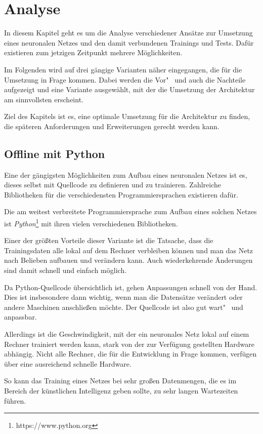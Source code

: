 \section{Analyse}
\label{sec:analyse}
In diesem Kapitel geht es um die Analyse verschiedener Ansätze zur Umsetzung eines neuronalen Netzes und den damit
verbundenen Trainings und Tests. Dafür existieren zum jetzigen Zeitpunkt mehrere Möglichkeiten.

Im Folgenden wird auf drei gängige Varianten näher eingegangen, die für die Umsetzung in Frage kommen. Dabei werden die
Vor"~ und auch die Nachteile aufgezeigt und eine Variante ausgewählt, mit der die Umsetzung der Architektur am
sinnvollsten erscheint.

Ziel des Kapitels ist es, eine optimale Umsetzung für die Architektur zu finden, die späteren Anforderungen und
Erweiterungen gerecht werden kann.

\subsection{Offline mit Python}
Eine der gängigsten Möglichkeiten zum Aufbau eines neuronalen Netzes ist es, dieses selbst mit Quellcode zu definieren
und zu trainieren. Zahlreiche Bibliotheken für die verschiedensten Programmiersprachen existieren dafür.

Die am weitest verbreitete Programmiersprache zum Aufbau eines solchen Netzes ist
\textit{Python}\footnote{https://www.python.org} mit ihren vielen verschiedenen Bibliotheken.

Einer der größten Vorteile dieser Variante ist die Tatsache, dass die Trainingsdaten alle lokal auf dem Rechner
verbleiben können und man das Netz nach Belieben aufbauen und verändern kann. Auch wiederkehrende Änderungen sind damit
schnell und einfach möglich.

Da Python-Quellcode übersichtlich ist, gehen Anpassungen schnell von der Hand. Dies ist insbesondere dann wichtig, wenn
man die Datensätze verändert oder andere Maschinen anschließen möchte. Der Quellcode ist also gut wart"~ und anpassbar.

Allerdings ist die Geschwindigkeit, mit der ein neuronales Netz lokal auf einem Rechner trainiert werden kann, stark
von der zur Verfügung gestellten Hardware abhängig. Nicht alle Rechner, die für die Entwicklung in Frage kommen,
verfügen über eine ausreichend schnelle Hardware.

So kann das Training eines Netzes bei sehr großen Datenmengen, die es im Bereich der künstlichen Intelligenz geben
sollte, zu sehr langen Wartezeiten führen.

